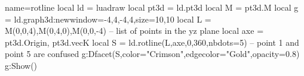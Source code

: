 \begin{luadraw}{name=rotline}
local ld = luadraw
local pt3d = ld.pt3d
local M = pt3d.M
local g = ld.graph3d:new{window={-4,4,-4,4},size={10,10}}
local L = {M(0,0,4),M(0,4,0),M(0,0,-4)} -- list of points in the yz plane
local axe = {pt3d.Origin, pt3d.vecK}
local S = ld.rotline(L,axe,0,360,{nbdots=5}) -- point 1 and point 5 are confused
g:Dfacet(S,{color="Crimson",edgecolor="Gold",opacity=0.8})
g:Show()
\end{luadraw}
